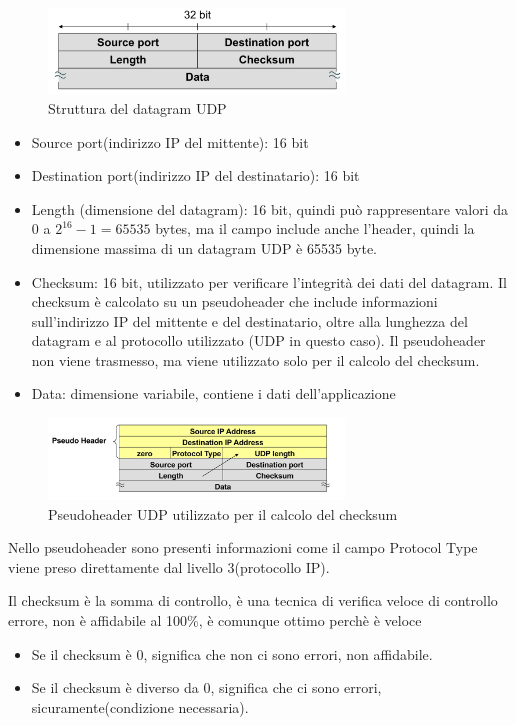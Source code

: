 \begin{figure}[h!]
    \centering
    \includegraphics[width=0.7\textwidth]{images/datagram_udp.png}
    \caption{Struttura del datagram UDP}
    \label{fig:datagramudp}
\end{figure}

\begin{itemize}
    \item Source port(indirizzo IP del mittente): 16 bit
    \item Destination port(indirizzo IP del destinatario): 16 bit 
    \item Length (dimensione del datagram): 16 bit, quindi può rappresentare valori da 0 a $2^{16}-1 = 65535$ bytes, ma il campo include anche l'header, quindi la dimensione massima di un datagram UDP è 65535 byte.
    \item Checksum: 16 bit, utilizzato per verificare l'integrità dei dati del datagram. Il checksum è calcolato su un pseudoheader che include informazioni sull'indirizzo IP del mittente e del destinatario, oltre alla lunghezza del datagram e al protocollo utilizzato (UDP in questo caso). Il pseudoheader non viene trasmesso, ma viene utilizzato solo per il calcolo del checksum. 
    \item Data: dimensione variabile, contiene i dati dell'applicazione
\end{itemize}


\begin{figure}[h!]
    \centering
    \includegraphics[width=0.7\textwidth]{images/pseudoheaderUDP.png}
    \caption{Pseudoheader UDP utilizzato per il calcolo del checksum}
    \label{fig:psudoheaderudp}
\end{figure}

Nello pseudoheader sono presenti informazioni come il campo Protocol Type viene preso direttamente dal livello 3(protocollo IP).

Il checksum è la somma di controllo, è una tecnica di verifica veloce di controllo errore, non è affidabile al 100\%, è comunque ottimo perchè è veloce  
\begin{itemize}
    \item Se il checksum è 0, significa che non ci sono errori, non affidabile.
    \item Se il checksum è diverso da 0, significa che ci sono errori, sicuramente(condizione necessaria).
\end{itemize}
\newpage
